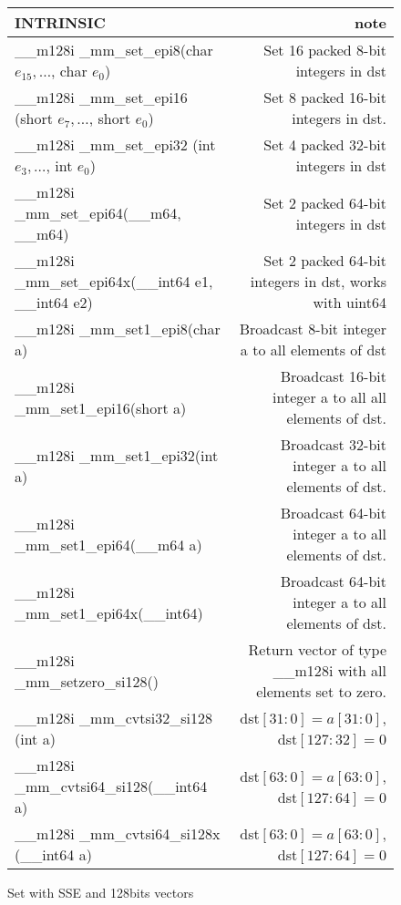 \documentclass{article}
\begin{document}
\begin{figure}[h!]
\begin{tabular}{|l|r|}
  \hline
  INTRINSIC & note \\
  \hline
  \_\_m128i \_mm\_set\_epi8(char $e_{15},\ldots$, char $e_0$) & Set 16 packed 8-bit integers in dst \\
  \hline
  \_\_m128i \_mm\_set\_epi16 (short $e_7, \ldots$, short $e_0$) & Set 8 packed 16-bit integers in dst.\\
  \hline
  \_\_m128i \_mm\_set\_epi32 (int $e_3, \ldots$, int $e_0$) & Set 4 packed 32-bit integers in dst  \\
  \hline
   \_\_m128i \_mm\_set\_epi64(\_\_m64, \_\_m64)  & Set 2 packed 64-bit integers in dst\\
  \hline
  \_\_m128i \_mm\_set\_epi64x(\_\_int64 e1, \_\_int64 e2)&Set 2 packed 64-bit integers in dst, works with uint64\\
  \hline
  \_\_m128i \_mm\_set1\_epi8(char a) & Broadcast 8-bit integer a to all elements of dst\\
  \hline
   \_\_m128i \_mm\_set1\_epi16(short a) & Broadcast 16-bit integer a to all all elements of dst.\\
  \hline 
   \_\_m128i \_mm\_set1\_epi32(int a) & Broadcast 32-bit integer a to all elements of dst.\\
  \hline
   \_\_m128i \_mm\_set1\_epi64(\_\_m64 a) & Broadcast 64-bit integer a to all elements of dst.\\
  \hline
  \_\_m128i \_mm\_set1\_epi64x(\_\_int64) & Broadcast 64-bit integer a to all elements of dst.\\
  \hline
  \_\_m128i \_mm\_setzero\_si128()& Return vector of type \_\_m128i with all elements set to zero.\\
  \hline
  \_\_m128i \_mm\_cvtsi32\_si128 (int a) & dst$[31:0] = a[31:0]$, dst$[127:32] = 0$ \\
  \hline
  \_\_m128i \_mm\_cvtsi64\_si128(\_\_int64 a) & dst$[63:0] = a[63:0]$, dst$[127:64] = 0$\\
   \hline
   \_\_m128i \_mm\_cvtsi64\_si128x (\_\_int64 a) & dst$[63:0] = a[63:0]$, dst$[127:64] = 0$\\
   \hline
\end{tabular}
    \caption{Set with SSE and 128bits vectors}
    \label{fig:set of set of 128instructions}
\end{figure}

\newpage
\end{document}

